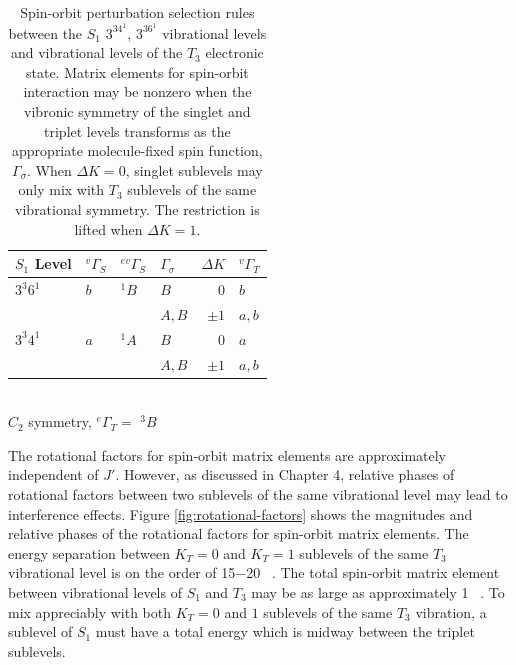 \documentclass[12pt]{mitthesis}
\begin{document}
\begin{table}
  \caption{Spin-orbit perturbation selection rules between the $S_1$ $3^34^1$, 
    $3^36^1$ vibrational levels and vibrational levels of the $T_3$ 
    electronic state. Matrix elements for spin-orbit interaction may 
    be nonzero when the vibronic symmetry of the singlet and triplet 
    levels transforms as the appropriate molecule-fixed spin function,
    $\Gamma_{\sigma}$.  When $\Delta K = 0$, singlet sublevels may only 
    mix with $T_3$ sublevels of the same vibrational symmetry.  The 
    restriction is lifted when $\Delta K=1$.
  }
  \label{table:delta-k}
  \centering
  \begin{tabular}{llllrl}
    \\
    $S_1$ Level
    & $^{v}\Gamma_S$ & $^{ev}\Gamma_S$ & $\Gamma_\sigma$ & $\Delta K$ & $^{v}\Gamma_T$ \\
    \midrule
    
    $3^3 6^1$ 
    & $b$ & $^{1}B$ & $B$ & $0$ & $b$ \\
    & & & $A, B$ & $\pm1$ & $a, b$ \\
    
    $3^3 4^1$ 
    & $a$ & $^{1}A$ & $B$ & $0$ & $a$ \\
    & & & $A, B$ & $\pm1$ & $a, b$ \\[10pt]
    
  \end{tabular}\\[5mm]
  
  $C_{2}$ symmetry, $^{e}\Gamma_T =$ $^{3}B$
\end{table}

The rotational factors for spin-orbit matrix elements are
approximately independent of $J'$.  However, as discussed in Chapter
4, relative phases of rotational factors between two sublevels of the
same vibrational level may lead to interference effects.  Figure
\ref{fig:rotational-factors} shows the magnitudes and relative phases of
the rotational factors for spin-orbit matrix elements.  The energy
separation between $K_T=0$ and $K_T=1$ sublevels of the same $T_3$
vibrational level is on the order of 15$-$20 \rcm\ \cite{thom07}.  The total
spin-orbit matrix element between vibrational levels of $S_1$ and
$T_3$ may be as large as approximately 1 \rcm\ \cite{thom07}.  To mix
appreciably with both $K_T=0$ and $1$ sublevels of the same $T_3$
vibration, a sublevel of $S_1$ must have a total energy which is
midway between the triplet sublevels.

\end{document}
